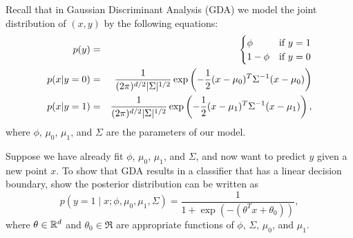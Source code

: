 \item {}
Recall that in Gaussian Discriminant Analysis (GDA) we model the joint distribution of $(x, y)$ by the following
equations:
%
\begin{eqnarray*}
	p(y) &=& \begin{cases}
	\phi & \mbox{if~} y = 1 \\
	1 - \phi & \mbox{if~} y = 0 \end{cases} \\
	p(x | y=0) &=& \frac{1}{(2\pi)^{{d}/2} |\Sigma|^{1/2}}
		\exp\left(-\frac{1}{2}(x-\mu_{0})^T \Sigma^{-1} (x-\mu_{0})\right) \\
	p(x | y=1) &=& \frac{1}{(2\pi)^{{d}/2} |\Sigma|^{1/2}}
		\exp\left(-\frac{1}{2}(x-\mu_1)^T \Sigma^{-1} (x-\mu_1) \right),
\end{eqnarray*}
%
where $\phi$, $\mu_0$, $\mu_1$, and $\Sigma$ are the parameters of our model.

Suppose we have already fit $\phi$, $\mu_0$, $\mu_1$, and $\Sigma$, and now
want to predict $y$ given a new point $x$. To show that GDA results in a
classifier that has a linear decision boundary, show the posterior distribution
can be written as
%
\begin{equation*}
	p(y = 1\mid x; \phi, \mu_0, \mu_1, \Sigma)
	= \frac{1}{1 + \exp(-(\theta^T x + \theta_0))},
\end{equation*}
%
where $\theta\in{\mathbb R}^{d}$ and $\theta_{0}\in\Re$ are appropriate functions of
$\phi$, $\Sigma$, $\mu_0$, and $\mu_1$.

